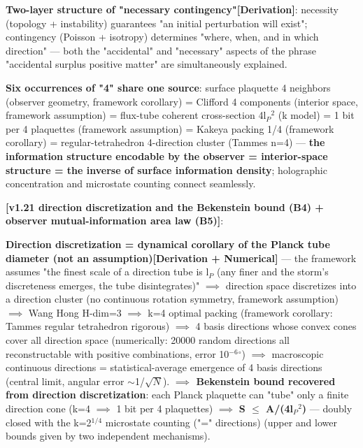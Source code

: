 \documentclass[12pt]{article}
\newcommand{\mtag}[1]{\textbf{[#1]}}
\newcommand{\up}[1]{\ensuremath{^{#1}}}
\newcommand{\down}[1]{\ensuremath{_{#1}}}
\begin{document}
\textbf{Two-layer structure of "necessary contingency"}\mtag{Derivation}: necessity (topology + instability) guarantees "an initial perturbation will exist"; contingency (Poisson + isotropy) determines "where, when, and in which direction" --- both the "accidental" and "necessary" aspects of the phrase "accidental surplus positive matter" are simultaneously explained.

\textbf{Six occurrences of "4" share one source}: surface plaquette 4 neighbors (observer geometry, framework corollary) = Clifford 4 components (interior space, framework assumption) = flux-tube coherent cross-section 4l\down{P}\up{2} (k model) = 1 bit per 4 plaquettes (framework assumption) = Kakeya packing 1/4 (framework corollary) = regular-tetrahedron 4-direction cluster (Tammes n=4) --- \textbf{the information structure encodable by the observer = interior-space structure = the inverse of surface information density}; holographic concentration and microstate counting connect seamlessly.

\textbf{\mtag{v1.21 direction discretization and the Bekenstein bound (B4) + observer mutual-information area law (B5)}}:

\textbf{Direction discretization = dynamical corollary of the Planck tube diameter (not an assumption)}\mtag{Derivation + Numerical} --- the framework assumes "the finest scale of a direction tube is l\down{P} (any finer and the storm's discreteness emerges, the tube disintegrates)" \ensuremath{\implies} direction space discretizes into a direction cluster (no continuous rotation symmetry, framework assumption) \ensuremath{\implies} Wang Hong H-dim=3 \ensuremath{\implies} k=4 optimal packing (framework corollary: Tammes regular tetrahedron rigorous) \ensuremath{\implies} 4 basis directions whose convex cones cover all direction space (numerically: 20000 random directions all reconstructable with positive combinations, error 10\up{-6}\ensuremath{^{\circ}}) \ensuremath{\implies} macroscopic continuous directions = statistical-average emergence of 4 basis directions (central limit, angular error \ensuremath{\sim}1/\ensuremath{\sqrt{N}}). \textbf{\ensuremath{\implies} Bekenstein bound recovered from direction discretization}: each Planck plaquette can "tube" only a finite direction cone (k=4 \ensuremath{\implies} 1 bit per 4 plaquettes) \ensuremath{\implies} \textbf{S \ensuremath{\leq} A/(4l\down{P}\up{2})} --- doubly closed with the k=2\up{1/4} microstate counting ("=" directions) (upper and lower bounds given by two independent mechanisms).
\end{document}
